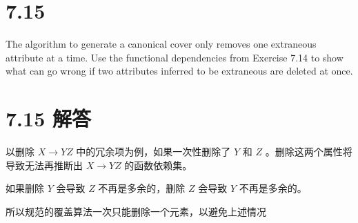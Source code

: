 \documentclass{article}
\begin{document}
	\section*{7.15} 
	The algorithm to generate a canonical cover only removes one extraneous attribute at a time. Use the functional dependencies from Exercise 7.14 to show what can go wrong if two attributes inferred to be extraneous are deleted at once.
	
	\section*{7.15 解答}
	
	以删除 $X \to YZ$ 中的冗余项为例，如果一次性删除了 $Y$ 和 $Z$ 。删除这两个属性将导致无法再推断出 $X \to YZ$ 的函数依赖集。
	
	如果删除 $Y$ 会导致 $Z$ 不再是多余的，删除 $Z$ 会导致 $Y$ 不再是多余的。
	
	所以规范的覆盖算法一次只能删除一个元素，以避免上述情况
	
\end{document}
